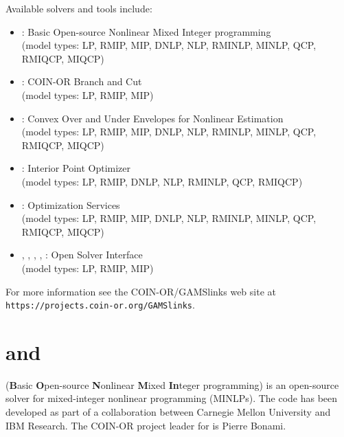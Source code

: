 Available solvers and tools include:
\begin{itemize}
\item \BONMIN: Basic Open-source Nonlinear Mixed Integer programming\\
(model types: LP, RMIP, MIP, DNLP, NLP, RMINLP, MINLP, QCP, RMIQCP, MIQCP)
\item \CBC: COIN-OR Branch and Cut\\
(model types: LP, RMIP, MIP)
\item \COUENNE: Convex Over and Under Envelopes for Nonlinear Estimation\\
(model types: LP, RMIP, MIP, DNLP, NLP, RMINLP, MINLP, QCP, RMIQCP, MIQCP)
\item \IPOPT: Interior Point Optimizer\\
(model types: LP, RMIP, DNLP, NLP, RMINLP, QCP, RMIQCP)
\item \OS: Optimization Services\\
(model types: LP, RMIP, MIP, DNLP, NLP, RMINLP, MINLP, QCP, RMIQCP, MIQCP)
\item \OSICPLEX, \OSIGUROBI, \OSIMOSEK, \OSISOPLEX, \OSIXPRESS: Open Solver Interface\\
(model types: LP, RMIP, MIP)
\end{itemize}

For more information see the COIN-OR/GAMSlinks web site at
\texttt{https://projects.coin-or.org/GAMSlinks}.

\section{\BONMIN and \BONMINH}


\BONMIN (\textbf{B}asic \textbf{O}pen-source \textbf{N}onlinear \textbf{M}ixed \textbf{In}teger programming) is an open-source solver for mixed-integer nonlinear programming (MINLPs).
The code has been developed as part of a collaboration between Carnegie Mellon University and IBM Research.
The COIN-OR project leader for \BONMIN is Pierre Bonami.

